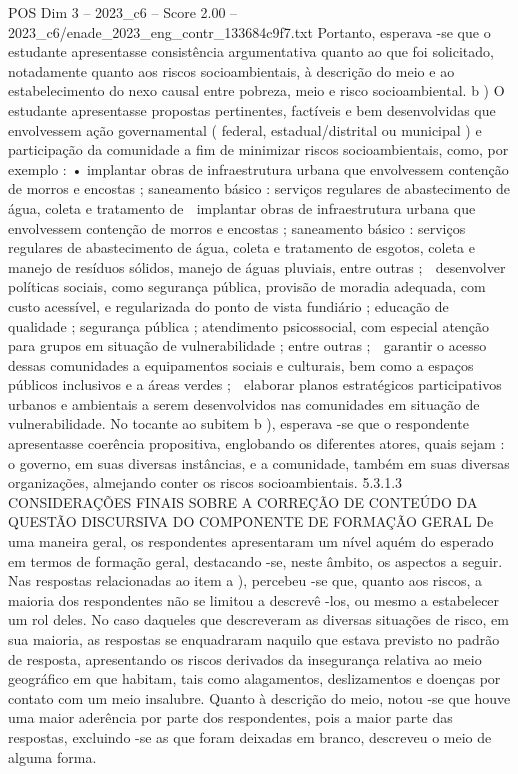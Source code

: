 \begin{textsample}{POS Dim 3 – 2023\_c6 – Score 2.00 – 2023\_c6/enade\_2023\_eng\_contr\_133684c9f7.txt}
Portanto, esperava -se que o estudante apresentasse consistência argumentativa quanto ao que foi solicitado, notadamente quanto aos riscos socioambientais, à descrição do meio e ao estabelecimento do nexo causal entre pobreza, meio e risco socioambiental. b ) O estudante apresentasse propostas pertinentes, factíveis e bem desenvolvidas que envolvessem ação governamental ( federal, estadual/distrital ou municipal ) e participação da comunidade a fim de minimizar riscos socioambientais, como, por exemplo : • implantar obras de infraestrutura urbana que envolvessem contenção de morros e encostas ; saneamento básico : serviços regulares de abastecimento de água, coleta e tratamento de  implantar obras de infraestrutura urbana que envolvessem contenção de morros e encostas ; saneamento básico : serviços regulares de abastecimento de água, coleta e tratamento de esgotos, coleta e manejo de resíduos sólidos, manejo de águas pluviais, entre outras ;  desenvolver políticas sociais, como segurança pública, provisão de moradia adequada, com custo acessível, e regularizada do ponto de vista fundiário ; educação de qualidade ; segurança pública ; atendimento psicossocial, com especial atenção para grupos em situação de vulnerabilidade ; entre outras ;  garantir o acesso dessas comunidades a equipamentos sociais e culturais, bem como a espaços públicos inclusivos e a áreas verdes ;  elaborar planos estratégicos participativos urbanos e ambientais a serem desenvolvidos nas comunidades em situação de vulnerabilidade.
No tocante ao subitem b ), esperava -se que o respondente apresentasse coerência propositiva, englobando os diferentes atores, quais sejam : o governo, em suas diversas instâncias, e a comunidade, também em suas diversas organizações, almejando conter os riscos socioambientais. 5.3.1.3 CONSIDERAÇÕES FINAIS SOBRE A CORREÇÃO DE CONTEÚDO DA QUESTÃO DISCURSIVA DO COMPONENTE DE FORMAÇÃO GERAL De uma maneira geral, os respondentes apresentaram um nível aquém do esperado em termos de formação geral, destacando -se, neste âmbito, os aspectos a seguir.
Nas respostas relacionadas ao item a ), percebeu -se que, quanto aos riscos, a maioria dos respondentes não se limitou a descrevê -los, ou mesmo a estabelecer um rol deles.
No caso daqueles que descreveram as diversas situações de risco, em sua maioria, as respostas se enquadraram naquilo que estava previsto no padrão de resposta, apresentando os riscos derivados da insegurança relativa ao meio geográfico em que habitam, tais como alagamentos, deslizamentos e doenças por contato com um meio insalubre.
Quanto à descrição do meio, notou -se que houve uma maior aderência por parte dos respondentes, pois a maior parte das respostas, excluindo -se as que foram deixadas em branco, descreveu o meio de alguma forma.

\end{textsample}
